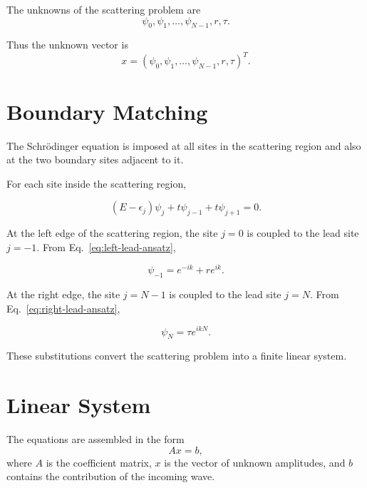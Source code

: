 The unknowns of the scattering problem are
\begin{equation}
	\psi_0,\psi_1,\ldots,\psi_{N-1},r,\tau.
\end{equation}

Thus the unknown vector is
\begin{equation}
	x
	=
	(\psi_0,\psi_1,\ldots,\psi_{N-1},r,\tau)^T.
	\label{eq:unknown-vector}
\end{equation}

\section{Boundary Matching}

The Schrödinger equation is imposed at all sites in the scattering
region and also at the two boundary sites adjacent to it.

For each site inside the scattering region,

\begin{equation}
	(E-\epsilon_j)\psi_j
	+
	t\psi_{j-1}
	+
	t\psi_{j+1}
	=
	0.
\end{equation}

At the left edge of the scattering region, the site $j=0$ is coupled to
the lead site $j=-1$. From Eq.~\eqref{eq:left-lead-ansatz},

\begin{equation}
	\psi_{-1}
	=
	e^{-ik}
	+
	r e^{ik}.
	\label{eq:psi-minus-one}
\end{equation}

At the right edge, the site $j=N-1$ is coupled to the lead site $j=N$.
From Eq.~\eqref{eq:right-lead-ansatz},

\begin{equation}
	\psi_N
	=
	\tau e^{ikN}.
	\label{eq:psi-N}
\end{equation}

These substitutions convert the scattering problem into a finite linear
system.

\section{Linear System}

The equations are assembled in the form
\begin{equation}
	A x = b,
	\label{eq:linear-system}
\end{equation}
where $A$ is the coefficient matrix, $x$ is the vector of unknown
amplitudes, and $b$ contains the contribution of the incoming wave.

